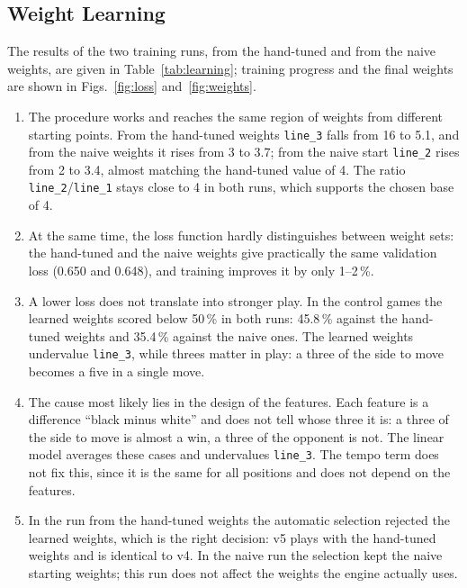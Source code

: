 \documentclass[a4paper,10pt,twocolumn]{article}
\newenvironment{points}{\begin{enumerate}[label=(\arabic*),leftmargin=*,itemsep=2pt,topsep=3pt]}{\end{enumerate}}
\newcommand{\code}[1]{\texttt{#1}}
\begin{document}
\subsection{Weight Learning}\label{sec:learning-results}
The results of the two training runs, from the hand-tuned and from the naive weights, are given in Table~\ref{tab:learning}; training progress and the final weights are shown in Figs.~\ref{fig:loss} and~\ref{fig:weights}.
\begin{points}
\item The procedure works and reaches the same region of weights from different starting points. From the hand-tuned weights \code{line\_3} falls from 16 to 5.1, and from the naive weights it rises from 3 to 3.7; from the naive start \code{line\_2} rises from 2 to 3.4, almost matching the hand-tuned value of 4. The ratio \code{line\_2}/\code{line\_1} stays close to 4 in both runs, which supports the chosen base of 4.
\item At the same time, the loss function hardly distinguishes between weight sets: the hand-tuned and the naive weights give practically the same validation loss (0.650 and 0.648), and training improves it by only 1--2\,\%.
\item A lower loss does not translate into stronger play. In the control games the learned weights scored below 50\,\% in both runs: 45.8\,\% against the hand-tuned weights and 35.4\,\% against the naive ones. The learned weights undervalue \code{line\_3}, while threes matter in play: a three of the side to move becomes a five in a single move.
\item The cause most likely lies in the design of the features. Each feature is a difference ``black minus white'' and does not tell whose three it is: a three of the side to move is almost a win, a three of the opponent is not. The linear model averages these cases and undervalues \code{line\_3}. The tempo term does not fix this, since it is the same for all positions and does not depend on the features.
\item In the run from the hand-tuned weights the automatic selection rejected the learned weights, which is the right decision: v5 plays with the hand-tuned weights and is identical to v4. In the naive run the selection kept the naive starting weights; this run does not affect the weights the engine actually uses.
\end{points}
\end{document}
